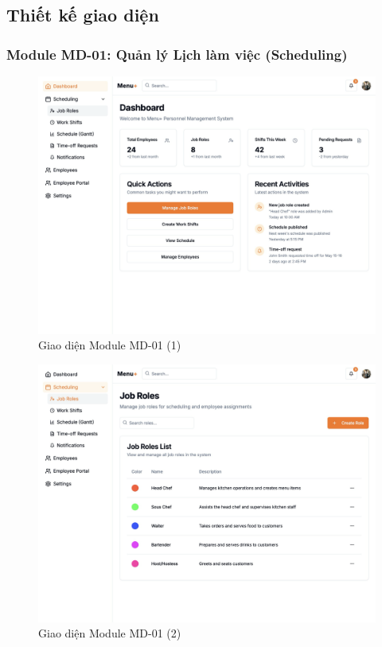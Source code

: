 \subsection{Thiết kế giao diện}
\subsubsection{Module MD-01: Quản lý Lịch làm việc (Scheduling)}

\begin{figure}[H]
    \centering
    \includegraphics[width=\linewidth]{Sections/hien_thuc/img/1.1.png}
    \vspace{0.5cm}
    \caption{Giao diện Module MD-01 (1)}
    \label{fig:gantt_module_md01_1}
\end{figure}

\begin{figure}[H]
    \centering
    \includegraphics[width=\linewidth]{Sections/hien_thuc/img/1.2.png}
    \vspace{0.5cm}
    \caption{Giao diện Module MD-01 (2)}
    \label{fig:gantt_module_md01_2}
\end{figure}

